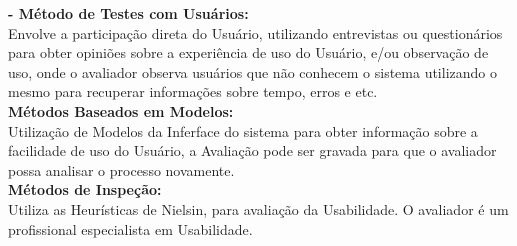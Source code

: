 \textbf{- Método de Testes com Usuários:}
	\\

	Envolve a participação direta do Usuário, utilizando entrevistas ou questionários para obter opiniões sobre a experiência de uso do Usuário, e/ou observação de uso, onde o avaliador observa usuários que não conhecem o sistema utilizando o mesmo para recuperar informações sobre tempo, erros e etc. \\

\textbf{Métodos Baseados em Modelos:}
	\\

	Utilização de Modelos da Inferface do sistema para obter informação sobre a facilidade de uso do Usuário, a Avaliação pode ser gravada para que o avaliador possa analisar o processo novamente. \\

\textbf{Métodos de Inspeção:}
	\\

	Utiliza as Heurísticas de Nielsin, \cite{usabilidade_interfaces} para avaliação da Usabilidade. O avaliador é um profissional especialista em Usabilidade.